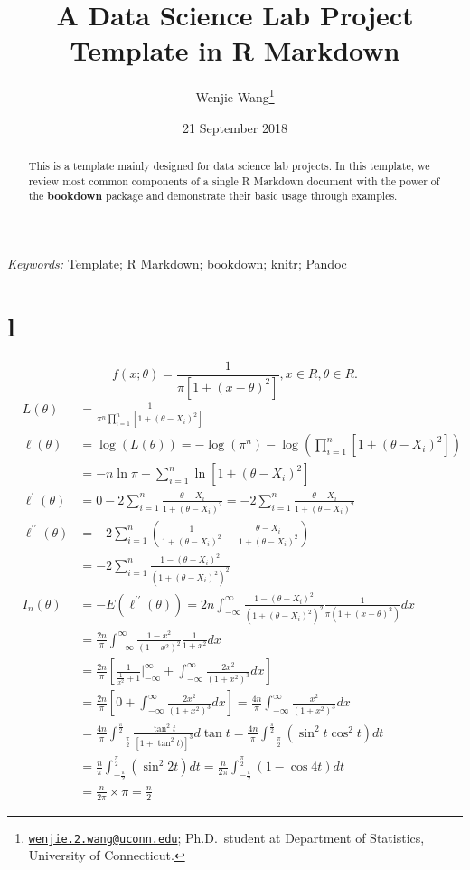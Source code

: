 \documentclass[11pt,letterpaper,]{article}
\title{A Data Science Lab Project Template in R Markdown}
\author{Wenjie Wang\footnote{\href{mailto:wenjie.2.wang@uconn.edu}{\nolinkurl{wenjie.2.wang@uconn.edu}};
  Ph.D.~student at Department of Statistics, University of Connecticut.}}
\date{21 September 2018}
\providecommand{\keywords}[1]{\textit{Keywords:} #1}
\newcommand{\pkg}[1]{{\normalfont\fontseries{b}\selectfont #1}}
\let\proglang=\textsf
\theoremstyle{definition}
\theoremstyle{definition}
\theoremstyle{definition}
\theoremstyle{remark}
\begin{document}
\maketitle
\begin{abstract}
This is a template mainly designed for data science lab projects. In
this template, we review most common components of a single R Markdown
document with the power of the \textbf{bookdown} package and demonstrate
their basic usage through examples.
\end{abstract}

\keywords{Template; \proglang{R Markdown}; \pkg{bookdown}; \pkg{knitr};
\pkg{Pandoc}}

\hypertarget{l}{%
\section{l}\label{l}}

\[f(x;\theta)=\frac{1}{\pi[1+(x-\theta)^2]}, x\in R, \theta \in R.\]
\begin{equation}
 \begin{split}
&L(\theta)&=\frac{1}{\pi^n \prod_{i=1}^{n}[1+(\theta-X_i)^2]}\\
&\ell(\theta)&=\log(L(\theta))=-\log(\pi^n)-\log(\prod_{i=1}^{n}[1+(\theta-X_i)^2])\\
&&=-n\ln\pi-\sum_{i=1}^{n} \ln[1+(\theta-X_i)^2]\\
&\ell^{\prime} (\theta) &=0-2\sum_{i=1}^{n} \frac {\theta-X_i}{1+(\theta-X_i)^2}=-2\sum_{i=1}^{n} \frac {\theta-X_i}{1+(\theta-X_i)^2}\\
&\ell^{\prime\prime} (\theta)&=-2\sum_{i=1}^{n}(\frac {1}{1+(\theta -X_i)^2}-\frac {\theta - X_i}{1+(\theta -X_i)^2})\\
&&=-2\sum_{i=1}^{n}\frac {1-(\theta - X_i)^2}{(1+(\theta -X_i)^2)^2}\\
&I_n(\theta)&=-E(\ell^{\prime \prime}(\theta))=2n\int_{-\infty}^{\infty}\frac{1-(\theta - X_i)^2}{(1+(\theta -X_i)^2)^2} \frac{1}{\pi (1+(x-\theta)^2)}dx\\
&&=\frac{2n}{\pi}\int_{-\infty}^{\infty}\frac{1-x^2}{(1+x^2)^2}\frac{1}{1+x^2}dx\\
&&=\frac{2n}{\pi}[\frac{1}{\frac{1}{x^2}+1}\Bigg|_{-\infty}^{\infty}+\int_{-\infty}^{\infty}\frac{2x^2}{(1+x^2)^3}dx]\\
&&=\frac{2n}{\pi}[0+\int_{-\infty}^{\infty}\frac{2x^2}{(1+x^2)^3}dx]
=\frac{4n}{\pi}\int_{-\infty}^{\infty}\frac{x^2}{(1+x^2)^3}dx\\
&&=\frac{4n}{\pi}\int_{-\frac{\pi}{2}}^{\frac{\pi}{2}}\frac{\tan^{2}{t}}{[1+\tan^{2}{t})]^3}d\tan{t}
=\frac{4n}{\pi}\int_{-\frac{\pi}{2}}^{\frac{\pi}{2}}(\sin^{2}{t}\cos^{2}{t})dt\\
&&=\frac{n}{\pi}\int_{-\frac{\pi}{2}}^{\frac{\pi}{2}}(\sin^{2}{2t})dt
=\frac{n}{2\pi}\int_{-\frac{\pi}{2}}^{\frac{\pi}{2}}(1-\cos{4t})dt\\
&&=\frac{n}{2\pi}\times \pi=\frac{n}{2}
 \end{split}
\end{equation}
\end{document}
